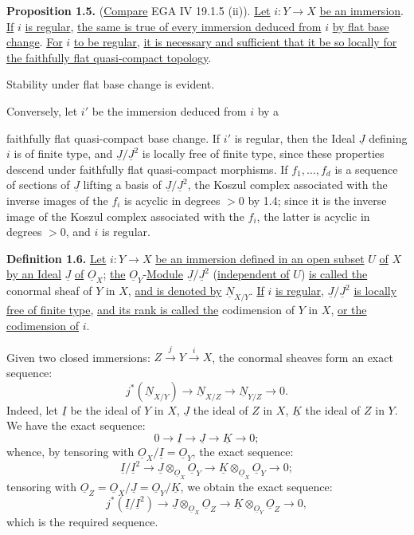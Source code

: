 \textbf{Proposition 1.5.} (\uline{Compare} EGA IV 19.1.5 (ii)). \uline{Let} $i:Y\longrightarrow X$ \uline{be an immersion}. \uline{If} $i$ \uline{is regular}, \uline{the same is true of every immersion deduced from} $i$ \uline{by flat base change}. \uline{For} $i$ \uline{to be regular}, \uline{it is necessary and sufficient that it be so locally for the faithfully flat quasi-compact topology}.

Stability under flat base change is evident.

Conversely, let $i'$ be the immersion deduced from $i$ by a

%
faithfully flat quasi-compact base change. If $i'$ is regular, then the Ideal $\underline{J}$ defining $i$ is of finite type, and $\underline{J}/\underline{J}^2$ is locally free of finite type, since these properties descend under faithfully flat quasi-compact morphisms. If $f_1,\ldots,f_d$ is a sequence of sections of $\underline{J}$ lifting a basis of $\underline{J}/\underline{J}^2$, the Koszul complex associated with the inverse images of the $f_i$ is acyclic in degrees $>0$ by 1.4; since it is the inverse image of the Koszul complex associated with the $f_i$, the latter is acyclic in degrees $>0$, and $i$ is regular.

\textbf{Definition 1.6.} \uline{Let} $i:Y\longrightarrow X$ \uline{be an immersion defined in an open subset} $U$ \uline{of} $X$ \uline{by an Ideal} $\underline{J}$ \uline{of} $\underline{O}_X$; \uline{the} $\underline{O}_Y$-\uline{Module} $\underline{J}/\underline{J}^2$ (\uline{independent of} $U$) \uline{is called the} conormal sheaf of $Y$ in $X$, \uline{and is denoted by} $\underline{N}_{X/Y}$. \uline{If} $i$ \uline{is regular}, $\underline{J}/\underline{J}^2$ \uline{is locally free of finite type}, \uline{and its rank is called the} codimension of $Y$ in $X$, \uline{or the} \uline{codimension of} $i$.

Given two closed immersions: $Z\xrightarrow{j}Y\xrightarrow{i}X$, the conormal sheaves form an exact sequence:
\begin{equation}\tag{1.6.1}
 j^*(\underline{N}_{X/Y})\longrightarrow \underline{N}_{X/Z}\longrightarrow \underline{N}_{Y/Z}\longrightarrow0.
\end{equation}
Indeed, let $\underline{I}$ be the ideal of $Y$ in $X$, $\underline{J}$ the ideal of $Z$ in $X$, $\underline{K}$ the ideal of $Z$ in $Y$. We have the exact sequence:
\[
0\longrightarrow \underline{I}\longrightarrow \underline{J}\longrightarrow \underline{K}\longrightarrow0;
\]
whence, by tensoring with $\underline{O}_X/\underline{I}=\underline{O}_Y$, the exact sequence:
\[
 \underline{I}/\underline{I}^2\longrightarrow \underline{J}\otimes_{\underline{O}_X}\underline{O}_Y\longrightarrow \underline{K}\otimes_{\underline{O}_X}\underline{O}_Y\longrightarrow0;
\]
tensoring with $\underline{O}_Z=\underline{O}_X/\underline{J}=\underline{O}_Y/\underline{K}$, we obtain the exact sequence:
\[
 j^*(\underline{I}/\underline{I}^2)\longrightarrow \underline{J}\otimes_{\underline{O}_X}\underline{O}_Z\longrightarrow \underline{K}\otimes_{\underline{O}_Y}\underline{O}_Z\longrightarrow0,
\]
which is the required sequence.
